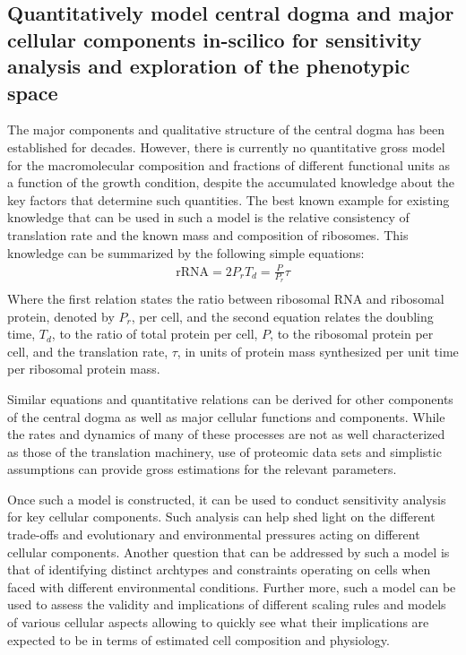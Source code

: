 \documentclass[notitlepage]{article}
\begin{document}
\subsection{Quantitatively model central dogma and major cellular components in-scilico for sensitivity analysis and exploration of the phenotypic space}
The major components and qualitative structure of the central dogma has been established for decades.
However, there is currently no quantitative gross model for the macromolecular composition and fractions of different functional units as a function of the growth condition, despite the accumulated knowledge about the key factors that determine such quantities.
The best known example for existing knowledge that can be used in such a model is the relative consistency of translation rate and the known mass and composition of ribosomes.
This knowledge can be summarized by the following simple equations:
\begin{eqnarray}
    \text{rRNA}=2P_r
    T_d=\frac{P}{P_r}\tau\\
\end{eqnarray}
Where the first relation states the ratio between ribosomal RNA and ribosomal protein, denoted by $P_r$, per cell, and the second equation relates the doubling time, $T_d$, to the ratio of total protein per cell, $P$, to the ribosomal protein per cell, and the translation rate, $\tau$, in units of protein mass synthesized per unit time per ribosomal protein mass.

Similar equations and quantitative relations can be derived for other components of the central dogma as well as major cellular functions and components.
While the rates and dynamics of many of these processes are not as well characterized as those of the translation machinery, use of proteomic data sets and simplistic assumptions can provide gross estimations for the relevant parameters.

Once such a model is constructed, it can be used to conduct sensitivity analysis for key cellular components.
Such analysis can help shed light on the different trade-offs and evolutionary and environmental pressures acting on different cellular components.
Another question that can be addressed by such a model is that of identifying distinct archtypes and constraints operating on cells when faced with different environmental conditions.
Further more, such a model can be used to assess the validity and implications of different scaling rules and models of various cellular aspects allowing to quickly see what their implications are expected to be in terms of estimated cell composition and physiology.
\end{document}
